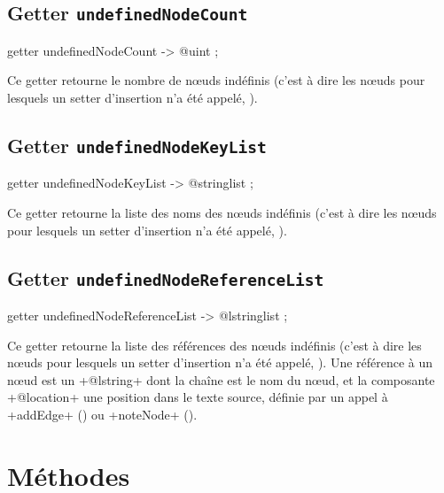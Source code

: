 \subsection{Getter \texttt{undefinedNodeCount}}

\begin{galgascode}
getter undefinedNodeCount -> @uint ;
\end{galgascode}

Ce getter retourne le nombre de nœuds indéfinis (c'est à dire les nœuds pour lesquels un setter d'insertion n'a été appelé, ).







\subsection{Getter \texttt{undefinedNodeKeyList}}

\begin{galgascode}
getter undefinedNodeKeyList -> @stringlist ;
\end{galgascode}

Ce getter retourne la liste des noms des nœuds indéfinis (c'est à dire les nœuds pour lesquels un setter d'insertion n'a été appelé, ).








\subsection{Getter \texttt{undefinedNodeReferenceList}}

\begin{galgascode}
getter undefinedNodeReferenceList -> @lstringlist ;
\end{galgascode}

Ce getter retourne la liste des références des nœuds indéfinis (c'est à dire les nœuds pour lesquels un setter d'insertion n'a été appelé, ). Une référence à un nœud est un \ggs+@lstring+ dont la chaîne est le nom du nœud, et la composante \ggs+@location+ une position dans le texte source, définie par un appel à \ggs+addEdge+ () ou \ggs+noteNode+ ().




\section{Méthodes}

